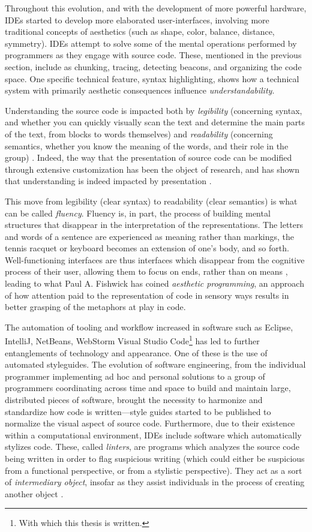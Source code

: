 Throughout this evolution, and with the development of more powerful hardware, IDEs started to develop more elaborated user-interfaces, involving more traditional concepts of aesthetics (such as shape, color, balance, distance, symmetry). IDEs attempt to solve some of the mental operations performed by programmers as they engage with source code. These, mentioned in the previous section, include as chunking, tracing, detecting beacons, and organizing the code space. One specific technical feature, syntax highlighting, shows how a technical system with primarily aesthetic consequences influence \emph{understandability}.

Understanding the source code is impacted both by \emph{legibility} (concerning syntax, and whether you can quickly visually scan the text and determine the main parts of the text, from blocks to words themselves) and \emph{readability} (concerning semantics, whether you know the meaning of the words, and their role in the group) \citep{oliveira_evaluating_2020}. Indeed, the way that the presentation of source code can be modified through extensive customization has been the object of research, and has shown that understanding is indeed impacted by presentation \citep{jacques_understanding_2015}.

This move from legibility (clear syntax) to readability (clear semantics) is what can be called \emph{fluency}. Fluency is, in part, the process of building mental structures that disappear in the interpretation of the representations. The letters and words of a sentence are experienced as meaning rather than markings, the tennis racquet or keyboard becomes an extension of one's body, and so forth. Well-functioning interfaces are thus interfaces which disappear from the cognitive process of their user, allowing them to focus on ends, rather than on means \citep{galloway_interface_2012}, leading to what Paul A. Fishwick has coined \emph{aesthetic programming}, an approach of how attention paid to the representation of code in sensory ways results in better grasping of the metaphors at play in code.

The automation of tooling and workflow increased in software such as Eclipse, IntelliJ, NetBeans, WebStorm Visual Studio Code\footnote{With which this thesis is written.} has led to further entanglements of technology and appearance. One of these is the use of automated styleguides. The evolution of software engineering, from the individual programmer implementing ad hoc and personal solutions to a group of programmers coordinating across time and space to build and maintain large, distributed pieces of software, brought the necessity to harmonize and standardize how code is written—style guides started to be published to normalize the visual aspect of source code. Furthermore, due to their existence within a computational environment, IDEs include software which automatically stylizes code. These, called \emph{linters}, are programs which analyzes the source code being written in order to flag suspicious writing (which could either be suspicious from a functional perspective, or from a stylistic perspective). They act as a sort of \emph{intermediary object}, insofar as they assist individuals in the process of creating another object \citep{jeantet_objets_1998}.

